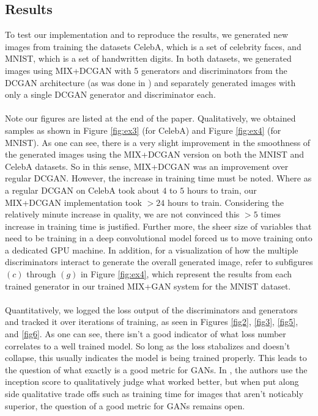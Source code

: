 \documentclass{article}
\begin{document}
\subsection{Results}
To test our implementation and to reproduce the results, we generated new images from training the datasets CelebA, which is a set of celebrity faces, and MNIST, which is a set of handwritten digits. In both datasets, we generated images using MIX+DCGAN with 5 generators and discriminators from the DCGAN architecture \citet{DBLP:journals/corr/RadfordMC15} (as was done in \citep{Arora17}) and separately generated images with only a single DCGAN generator and discriminator each. 
\\\\
Note our figures are listed at the end of the paper. Qualitatively, we obtained samples as shown in Figure \ref{fig:ex3} (for CelebA) and Figure \ref{fig:ex4} (for MNIST). As one can see, there is a very slight improvement in the smoothness of the generated images using the MIX+DCGAN version on both the MNIST and CelebA datasets. So in this sense, MIX+DCGAN was an improvement over regular DCGAN. However, the increase in training time must be noted. Where as a regular DCGAN on CelebA took about $4$ to $5$ hours to train, our MIX+DCGAN implementation took $>24$ hours to train. Considering the relatively minute increase in quality, we are not convinced this $>5$ times increase in training time is justified. Further more, the sheer size of variables that need to be training in a deep convolutional model forced us to move training onto a dedicated GPU machine. In addition, for a visualization of how the multiple discriminators interact to generate the overall generated image, refer to subfigures $(c)$ through $(g)$ in Figure \ref{fig:ex4}, which represent the results from each trained generator in our trained MIX+GAN system for the MNIST dataset. 
\\\\
Quantitatively, we logged the loss output of the discriminators and generators and tracked it over iterations of training, as seen in Figures \ref{fig2}, \ref{fig3}, \ref{fig5}, and \ref{fig6}. As one can see, there isn't a good indicator of what loss number correlates to a well trained model. So long as the loss stabalizes and doesn't collapse, this usually indicates the model is being trained properly. This leads to the question of what exactly is a good metric for GANs. In \cite{Arora17}, the authors use the inception score to qualitatively judge what worked better, but when put along side qualitative trade offs such as training time for images that aren't noticably superior, the question of a good metric for GANs remains open. 
\end{document}
